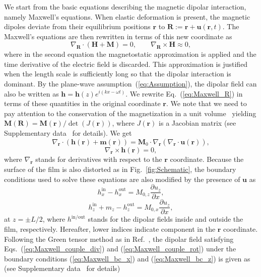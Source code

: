 \documentclass[10pt]{iopart}
\begin{document}
We start from the basic equations describing the magnetic dipolar interaction, namely Maxwell's equations. When elastic deformation is present, the magnetic dipoles deviate from their equilibrium positions $\bm{r}$ to $\bm{R}:=\bm{r}+\bm{u}(\bm{r},t)$. The Maxwell's equations are then rewritten in terms of this new coordinate as
\begin{equation}
    \nabla_{\bm{R}}\cdot \left(\bm{H}+\bm{M}\right)=0,\qquad
    \nabla_{\bm{R}}\times \bm{H}\approx 0,\label{eq:Maxwell_R}
\end{equation}
where in the second equation the magnetostatic approximation is applied and the time derivative of the electric field is discarded. This approximation is justified when the length scale is sufficiently long so that the dipolar interaction is dominant. By the plane-wave assumption~(\ref{eq:Assumption}), the dipolar field can also be written as $\bm{h}=\bm{h}(z)e^{i(kx-\omega t)}$. We rewrite Eq.~(\ref{eq:Maxwell_R}) in terms of these quantities in the original coordinate $\bm{r}$. We note that we need to pay attention to the conservation of the magnetization in a unit volume~\cite{Yamamoto_Maekawa_AnnPhys} yielding $\bm{M}(\bm{R})=\bm{M}(\bm{r})/\det(J(\bm{r}))$, where $J(\bm{r})$ is a Jacobian matrix (see Supplementary data~\cite{SM} for details). We get
\begin{equation}
    \nabla_{\bm{r}}\cdot\left(\bm{h}(\bm{r})+\bm{m}(\bm{r})\right)=\bm{M}_0\cdot\nabla_{\bm{r}}\left(\nabla_{\bm{r}}\cdot\bm{u}(\bm{r})\right),\label{eq:Maxwell_couple_div}
\end{equation}
\begin{equation}
    \nabla_{\bm{r}}\times\bm{h}(\bm{r})=0,\label{eq:Maxwell_couple_rot}
\end{equation}
where $\nabla_{\bm{r}}$ stands for derivatives with respect to the $\bm{r}$ coordinate. Because the surface of the film is also distorted as in Fig.~\ref{fig:Schematic}, the boundary conditions used to solve these equations are also modified by the presence of $\bm{u}$ as
\begin{equation}
    h^{\mathrm{in}}_x-h_x^{\mathrm{out}}=M_{0,z}\frac{\partial u_z}{\partial x},\label{eq:Maxwell_bc_x}
\end{equation}
\begin{equation}
    h^{\mathrm{in}}_z+m_z-h^{\mathrm{out}}_z=M_{0,x}\frac{\partial u_z}{\partial x},\label{eq:Maxwell_bc_z}
\end{equation}
at $z=\pm L/2$, where $h^{\mathrm{in}/\mathrm{out}}$ stands for the dipolar fields inside and outside the film, respectively. Hereafter, lower indices indicate component in the $\bm{r}$ coordinate. Following the Green tensor method as in Ref.~\cite{Kalinikos_Slavin_1986}, the dipolar field satisfying Eqs.~(\ref{eq:Maxwell_couple_div}) and (\ref{eq:Maxwell_couple_rot}) under the boundary conditions (\ref{eq:Maxwell_bc_x}) and (\ref{eq:Maxwell_bc_z}) is given as (see Supplementary data~\cite{SM} for details)
\end{document}
